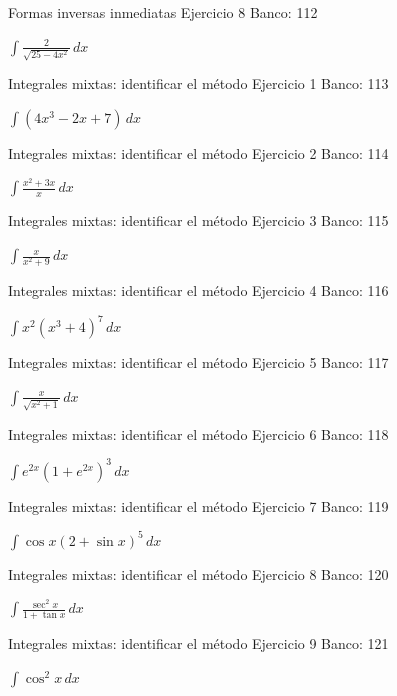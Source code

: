 \documentclass[aspectratio=169,12pt]{beamer}
\newcommand{\ejercicio}[1]{%
  \begin{center}
  \vfill
  {\fontsize{24}{30}\selectfont #1}
  \vfill
  \end{center}
}
\begin{document}
\begin{frame}{Formas inversas inmediatas}
\small Ejercicio 8 \hfill Banco: 112
\ejercicio{$\displaystyle \int\frac{2}{\sqrt{25-4x^2}}\,dx$}
\end{frame}

\begin{frame}{Integrales mixtas: identificar el método}
\small Ejercicio 1 \hfill Banco: 113
\ejercicio{$\displaystyle \int(4x^3-2x+7)\,dx$}
\end{frame}

\begin{frame}{Integrales mixtas: identificar el método}
\small Ejercicio 2 \hfill Banco: 114
\ejercicio{$\displaystyle \int\frac{x^2+3x}{x}\,dx$}
\end{frame}

\begin{frame}{Integrales mixtas: identificar el método}
\small Ejercicio 3 \hfill Banco: 115
\ejercicio{$\displaystyle \int\frac{x}{x^2+9}\,dx$}
\end{frame}

\begin{frame}{Integrales mixtas: identificar el método}
\small Ejercicio 4 \hfill Banco: 116
\ejercicio{$\displaystyle \int x^2(x^3+4)^7\,dx$}
\end{frame}

\begin{frame}{Integrales mixtas: identificar el método}
\small Ejercicio 5 \hfill Banco: 117
\ejercicio{$\displaystyle \int\frac{x}{\sqrt{x^2+1}}\,dx$}
\end{frame}

\begin{frame}{Integrales mixtas: identificar el método}
\small Ejercicio 6 \hfill Banco: 118
\ejercicio{$\displaystyle \int e^{2x}(1+e^{2x})^3\,dx$}
\end{frame}

\begin{frame}{Integrales mixtas: identificar el método}
\small Ejercicio 7 \hfill Banco: 119
\ejercicio{$\displaystyle \int\cos x(2+\sin x)^5\,dx$}
\end{frame}

\begin{frame}{Integrales mixtas: identificar el método}
\small Ejercicio 8 \hfill Banco: 120
\ejercicio{$\displaystyle \int\frac{\sec^2x}{1+\tan x}\,dx$}
\end{frame}

\begin{frame}{Integrales mixtas: identificar el método}
\small Ejercicio 9 \hfill Banco: 121
\ejercicio{$\displaystyle \int\cos^2x\,dx$}
\end{frame}
\end{document}

